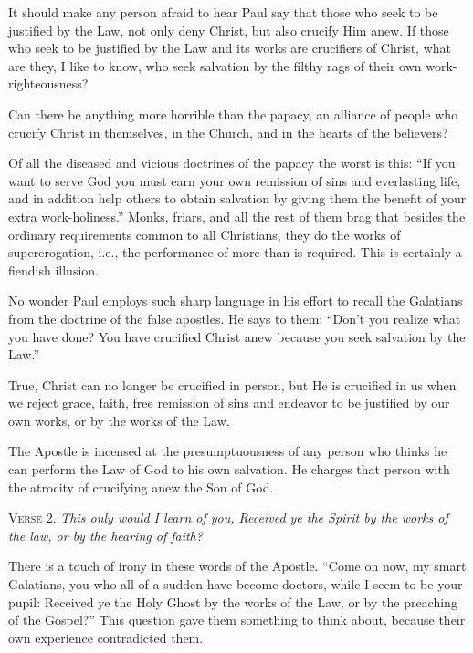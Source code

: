 It should make any person afraid to hear Paul say that those who seek to be justified by the Law, not only deny Christ, but also crucify Him anew. If those who seek to be justified by the Law and its works are crucifiers of Christ, what are they, I like to know, who seek salvation by the filthy rags of their own work-righteousness?

Can there be anything more horrible than the papacy, an alliance of people who crucify Christ in themselves, in the Church, and in the hearts of the believers?

Of all the diseased and vicious doctrines of the papacy the worst is this: “If you want to serve God you must earn your own remission of sins and everlasting life, and in addition help others to obtain salvation by giving them the benefit of your extra work-holiness.” Monks, friars, and all the rest of them brag that besides the ordinary requirements common to all Christians, they do the works of supererogation, i.e., the performance of more than is required. This is certainly a fiendish illusion.

No wonder Paul employs such sharp language in his effort to recall the Galatians from the doctrine of the false apostles. He says to them: “Don’t you realize what you have done? You have crucified Christ anew because you seek salvation by the Law.”

True, Christ can no longer be crucified in person, but He is crucified in us when we reject grace, faith, free remission of sins and endeavor to be justified by our own works, or by the works of the Law.

The Apostle is incensed at the presumptuousness of any person who thinks he can perform the Law of God to his own salvation. He charges that person with the atrocity of crucifying anew the Son of God.

\textsc{Verse} 2. \emph{This only would I learn of you, Received ye the Spirit by the works of the law, or by the hearing of faith?}

There is a touch of irony in these words of the Apostle. “Come on now, my smart Galatians, you who all of a sudden have become doctors, while I seem to be your pupil: Received ye the Holy Ghost by the works of the Law, or by the preaching of the Gospel?” This question gave them something to think about, because their own experience contradicted them.

